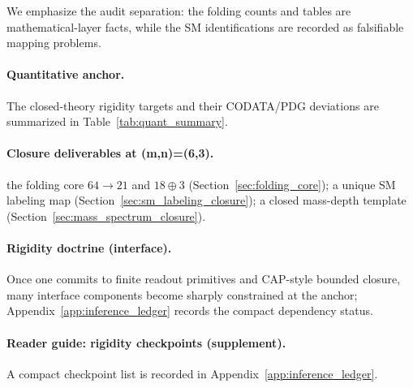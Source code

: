 We emphasize the audit separation: the folding counts and tables are mathematical-layer facts, while the SM identifications are recorded as falsifiable mapping problems.
\paragraph{Quantitative anchor.}
The closed-theory rigidity targets and their CODATA/PDG deviations are summarized in Table~\ref{tab:quant_summary}.

\paragraph{Closure deliverables at (m,n)=(6,3).}
\MathTag the folding core $64\to 21$ and $18\oplus 3$ (Section~\ref{sec:folding_core});
\InterfaceTag a unique SM labeling map (Section~\ref{sec:sm_labeling_closure});
\InterfaceTag a closed mass-depth template (Section~\ref{sec:mass_spectrum_closure}).

\paragraph{Rigidity doctrine (interface).}
\InterfaceTag Once one commits to finite readout primitives and CAP-style bounded closure, many interface components become sharply constrained at the anchor; Appendix~\ref{app:inference_ledger} records the compact dependency status.

\paragraph{Reader guide: rigidity checkpoints (supplement).}
\AuditTag A compact checkpoint list is recorded in Appendix~\ref{app:inference_ledger}.


